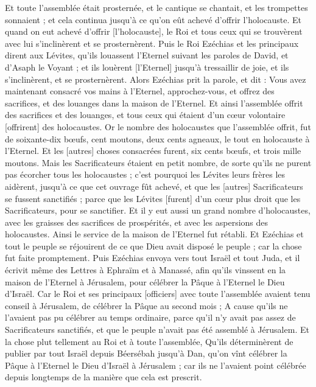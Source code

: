 \begin{multicols}{2}
Et toute l'assemblée était prosternée, et le cantique se chantait, et les trompettes sonnaient ; et cela continua jusqu'à ce qu'on eût achevé d'offrir l'holocauste.
Et quand on eut achevé d'offrir [l'holocauste], le Roi et tous ceux qui se trouvèrent avec lui s'inclinèrent et se prosternèrent.
Puis le Roi Ezéchias et les principaux dirent aux Lévites, qu'ils louassent l'Eternel suivant les paroles de David, et d'Asaph le Voyant ; et ils louèrent [l'Eternel] jusqu'à tressaillir de joie, et ils s'inclinèrent, et se prosternèrent.
Alors Ezéchias prit la parole, et dit : Vous avez maintenant consacré vos mains à l'Eternel, approchez-vous, et offrez des sacrifices, et des louanges dans la maison de l'Eternel. Et ainsi l'assemblée offrit des sacrifices et des louanges, et tous ceux qui étaient d'un cœur volontaire [offrirent] des holocaustes.
Or le nombre des holocaustes que l'assemblée offrit, fut de soixante-dix bœufs, cent moutons, deux cents agneaux, le tout en holocauste à l'Eternel.
Et les [autres] choses consacrées furent, six cents bœufs, et trois mille moutons.
Mais les Sacrificateurs étaient en petit nombre, de sorte qu'ils ne purent pas écorcher tous les holocaustes ; c'est pourquoi les Lévites leurs frères les aidèrent, jusqu'à ce que cet ouvrage fût achevé, et que les [autres] Sacrificateurs se fussent sanctifiés ; parce que les Lévites [furent] d'un cœur plus droit que les Sacrificateurs, pour se sanctifier.
Et il y eut aussi un grand nombre d'holocaustes, avec les graisses des sacrifices de prospérités, et avec les aspersions des holocaustes. Ainsi le service de la maison de l'Eternel fut rétabli.
Et Ezéchias et tout le peuple se réjouirent de ce que Dieu avait disposé le peuple ; car la chose fut faite promptement.
\VerseOne{}Puis Ezéchias envoya vers tout Israël et tout Juda, et il écrivit même des Lettres à Ephraïm et à Manassé, afin qu'ils vinssent en la maison de l'Eternel à Jérusalem, pour célébrer la Pâque à l'Eternel le Dieu d'Israël.
Car le Roi et ses principaux [officiers] avec toute l'assemblée avaient tenu conseil à Jérusalem, de célébrer la Pâque au second mois ;
A cause qu'ils ne l'avaient pas pu célébrer au temps ordinaire, parce qu'il n'y avait pas assez de Sacrificateurs sanctifiés, et que le peuple n'avait pas été assemblé à Jérusalem.
Et la chose plut tellement au Roi et à toute l'assemblée,
Qu'ils déterminèrent de publier par tout Israël depuis Béersébah jusqu'à Dan, qu'on vînt célébrer la Pâque à l'Eternel le Dieu d'Israël à Jérusalem ; car ils ne l'avaient point célébrée depuis longtemps de la manière que cela est prescrit.

\end{multicols}
